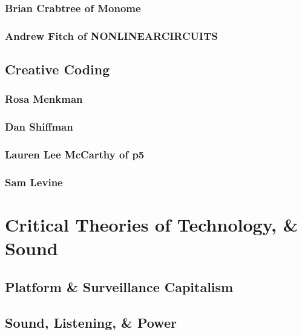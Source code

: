 \documentclass[
  american,
  12pt,
]{article}
\begin{document}
\subsubsection{Brian Crabtree of Monome}\label{brian-crabtree-of-monome}

\subsubsection{Andrew Fitch of
NONLINEARCIRCUITS}\label{andrew-fitch-of-nonlinearcircuits}

\subsection{Creative Coding}\label{creative-coding}

\subsubsection{Rosa Menkman}\label{rosa-menkman}

\subsubsection{Dan Shiffman}\label{dan-shiffman}

\subsubsection{Lauren Lee McCarthy of
p5}\label{lauren-lee-mccarthy-of-p5}

\subsubsection{Sam Levine}\label{sam-levine}

\section{Critical Theories of Technology, \&
Sound}\label{critical-theories-of-technology-sound}

\subsection{Platform \& Surveillance
Capitalism}\label{platform-surveillance-capitalism}

\subsection{Sound, Listening, \& Power}\label{sound-listening-power}
\end{document}
